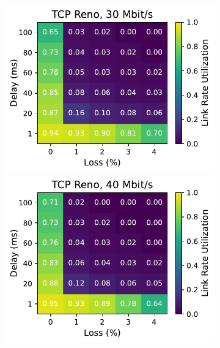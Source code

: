 \begin{figure}[ht]
\begin{subfigure}[b]{0.22\linewidth}
        \includegraphics[width=\linewidth,trim={0 0 2cm 0},clip]{splitting/figures/heatmaps/heatmap_tcp_reno_30mbps.pdf}
        \includegraphics[width=\linewidth,trim={0 0 2cm 0},clip]{splitting/figures/heatmaps/heatmap_tcp_reno_40mbps.pdf}

\end{subfigure}
\end{figure}
